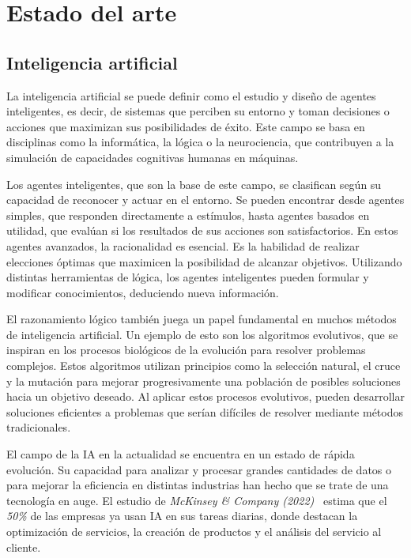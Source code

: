 \chapter{Estado del arte}
\label{ch:estado-arte}

\section{Inteligencia artificial}

La inteligencia artificial se puede definir como el estudio y diseño de agentes inteligentes, es decir, de sistemas que perciben su entorno y toman decisiones o acciones que maximizan sus posibilidades de éxito. Este campo se basa en disciplinas como la informática, la lógica o la neurociencia, que contribuyen a la simulación de capacidades cognitivas humanas en máquinas.

Los agentes inteligentes, que son la base de este campo, se clasifican según su capacidad de reconocer y actuar en el entorno. Se pueden encontrar desde agentes simples, que responden directamente a estímulos, hasta agentes basados en utilidad, que evalúan si los resultados de sus acciones son satisfactorios. En estos agentes avanzados, la racionalidad es esencial. Es la habilidad de realizar elecciones óptimas que maximicen la posibilidad de alcanzar objetivos. Utilizando distintas herramientas de lógica, los agentes inteligentes pueden formular y modificar conocimientos, deduciendo nueva información.

El razonamiento lógico también juega un papel fundamental en muchos métodos de inteligencia artificial. Un ejemplo de esto son los algoritmos evolutivos, que se inspiran en los procesos biológicos de la evolución para resolver problemas complejos. Estos algoritmos utilizan principios como la selección natural, el cruce y la mutación para mejorar progresivamente una población de posibles soluciones hacia un objetivo deseado. Al aplicar estos procesos evolutivos, pueden desarrollar soluciones eficientes a problemas que serían difíciles de resolver mediante métodos tradicionales.

El campo de la IA en la actualidad se encuentra en un estado de rápida evolución. Su capacidad para analizar y procesar grandes cantidades de datos o para mejorar la eficiencia en distintas industrias han hecho que se trate de una tecnología en auge. El estudio de \textit{McKinsey \& Company (2022)}~\cite{mckinsey2022ai} estima que el \textit{50\%} de las empresas ya usan IA en sus tareas diarias, donde destacan la optimización de servicios, la creación de productos y el análisis del servicio al cliente.


